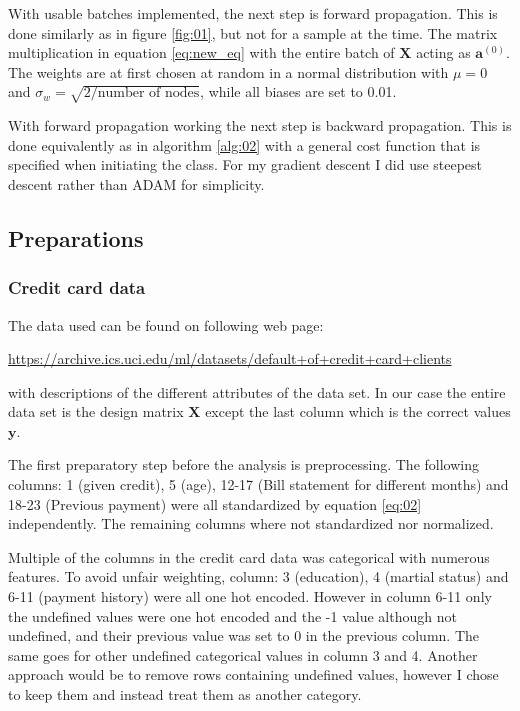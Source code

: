\documentclass[uio,jmp,amsmath,amssymb,reprint,nofootinbib]{revtex4-1}
\numberwithin{equation}{section}
\begin{document}
With usable batches implemented, the next step is forward propagation. This is done similarly as in figure \ref{fig:01}, but not for a sample at the time. The matrix multiplication in equation \ref{eq:new_eq} with the entire batch of \(\bm{X}\) acting as \(\bm{a}^{(0)}\). The weights are at first chosen at random in a normal distribution with \(\mu=0\) and \(\sigma_w = \sqrt{2/\text{number of nodes}}\), while all biases are set to 0.01.

With forward propagation working the next step is backward propagation. This is done equivalently as in algorithm \ref{alg:02} with a general cost function that is specified when initiating the class. For my gradient descent I did use steepest descent rather than ADAM for simplicity.


\subsection{Preparations}\label{sec:prep}

\subsubsection{Credit card data}

The data used can be found on following web page:

\url{https://archive.ics.uci.edu/ml/datasets/default+of+credit+card+clients}

with descriptions of the different attributes of the data set. In our case the entire data set is the design matrix \(\bm{X}\) except the last column which is the correct values \(\bm{y}\).

The first preparatory step before the analysis is preprocessing. The following columns: 1 (given credit), 5 (age), 12-17 (Bill statement for different months) and 18-23 (Previous payment) were all standardized by equation \ref{eq:02} independently. The remaining columns where not standardized nor normalized.

Multiple of the columns in the credit card data was categorical with numerous features. To avoid unfair weighting, column: 3 (education), 4 (martial status) and  6-11 (payment history) were all one hot encoded. However in column 6-11 only the undefined values were one hot encoded and the -1 value although not undefined, and their previous value was set to 0 in the previous column. The same goes for other undefined categorical values in column 3 and 4. Another approach would be to remove rows containing undefined values, however I chose to keep them and instead treat them as another category.
\end{document}
